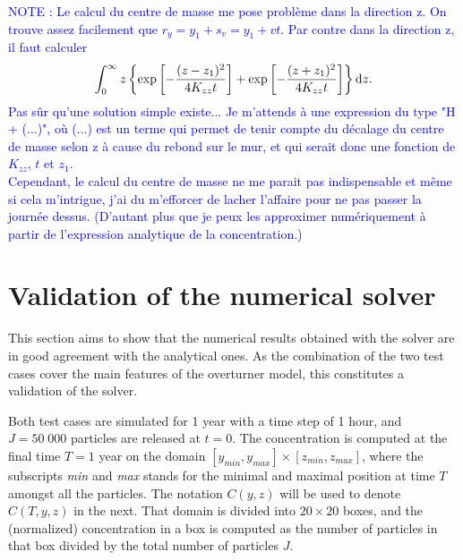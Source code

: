 \textcolor{blue}{NOTE : Le calcul du centre de masse me pose problème dans la direction z. On trouve assez facilement que $r_y = y_1 + s_v = y_1 + vt$. Par contre dans la direction z, il faut calculer $$\int_{0}^{\infty} z \left\{\exp\left[-\frac{(z-z_1)^2}{4K_{zz}t} \right] + \exp\left[-\frac{(z+z_1)^2}{4K_{zz}t} \right] \right\}\rm dz.$$ Pas sûr qu'une solution simple existe... Je m'attends à une expression du type "H + (...)", où (...) est un terme qui permet de tenir compte du décalage du centre de masse selon z à cause du rebond sur le mur, et qui serait donc une fonction de $K_{zz}$, $t$ et $z_1$.\\
Cependant, le calcul du centre de masse ne me parait pas indispensable et même si cela m'intrigue, j'ai du m'efforcer de lacher l'affaire pour ne pas passer la journée dessus. (D'autant plus que je peux les approximer numériquement à partir de l'expression analytique de la concentration.)}

\section*{Validation of the numerical solver}
This section aims to show that the numerical results obtained with the solver are in good agreement with the analytical ones. As the combination of the two test cases cover the main features of the overturner model, this constitutes a validation of the solver. 

Both test cases are simulated for 1 year with a time step of 1 hour, and $J = 50\;000$ particles are released at $t=0$.
The concentration is computed at the final time $T = 1$ year on the domain $[y_{min},y_{max}] \times [z_{min},z_{max}]$, where the subscripts \textit{min} and \textit{max} stands for the minimal and maximal position at time $T$ amongst all the particles. The notation $C(y,z)$ will be used to denote $C(T,y,z)$ in the next. That domain is divided into $20 \times 20$ boxes, and the (normalized) concentration in a box is computed as the number of particles in that box divided by the total number of particles $J$.

